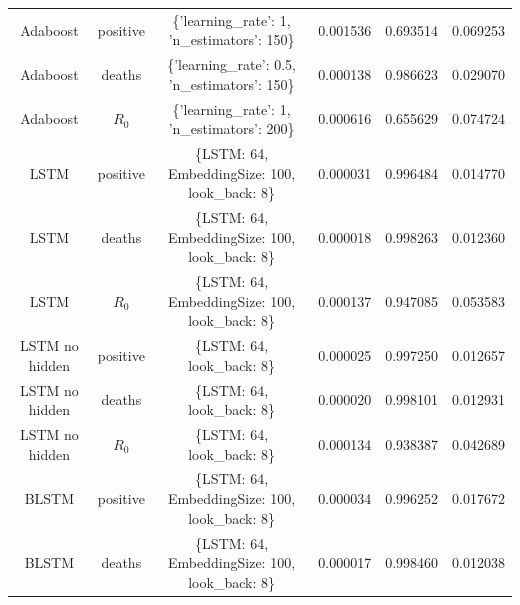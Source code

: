 \documentclass[anon]{CI}
\begin{document}
\begin{table}[t!]
{\begin{tabular}{|c|c|c|c|c|c|}
    \hline
    Adaboost        & positive & \{'learning\_rate': 1, 'n\_estimators': 150\}                      & 0.001536                & 0.693514                                 & 0.069253                      \\
    Adaboost        & deaths   & \{'learning\_rate': 0.5, 'n\_estimators': 150\}                    & 0.000138                & 0.986623                                 & 0.029070                      \\
    Adaboost        & $R_0$     & \{'learning\_rate': 1, 'n\_estimators': 200\}                      & 0.000616                & 0.655629                                 & 0.074724                      \\
    \hline
    LSTM            & positive & \{LSTM: 64, EmbeddingSize: 100, look\_back: 8\}                    & 0.000031                & 0.996484                                 & 0.014770                      \\
    LSTM            & deaths   & \{LSTM: 64, EmbeddingSize: 100, look\_back: 8\}                    & 0.000018                & 0.998263                                 & 0.012360                      \\
    LSTM            & $R_0$     & \{LSTM: 64, EmbeddingSize: 100, look\_back: 8\}                    & 0.000137                & 0.947085                                 & 0.053583                      \\
    \hline
    LSTM no hidden  & positive & \{LSTM: 64, look\_back: 8\}                                        & 0.000025                & 0.997250                                 & 0.012657                      \\
    LSTM no hidden  & deaths   & \{LSTM: 64, look\_back: 8\}                                        & 0.000020                & 0.998101                                 & 0.012931                      \\
    LSTM no hidden  & $R_0$     & \{LSTM: 64, look\_back: 8\}                                        & 0.000134                & 0.938387                                 & 0.042689                      \\
    \hline
    BLSTM           & positive & \{LSTM: 64, EmbeddingSize: 100, look\_back: 8\}                    & 0.000034                & 0.996252                                 & 0.017672                      \\
    BLSTM           & deaths   & \{LSTM: 64, EmbeddingSize: 100, look\_back: 8\}                    & 0.000017                & 0.998460                                 & 0.012038                      \\

\end{tabular}}
\end{table}
\end{document}

